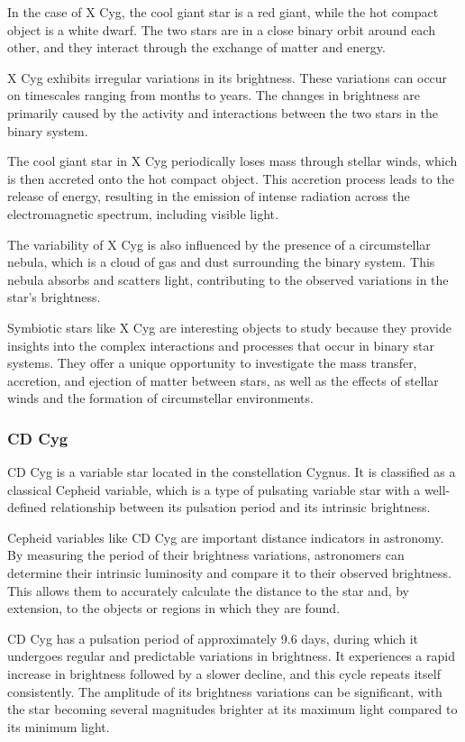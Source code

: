 In the case of X Cyg, the cool giant star is a red giant, while the hot compact object is a white dwarf. The two stars are in a close binary orbit around each other, and they interact through the exchange of matter and energy.

X Cyg exhibits irregular variations in its brightness. These variations can occur on timescales ranging from months to years. The changes in brightness are primarily caused by the activity and interactions between the two stars in the binary system.

The cool giant star in X Cyg periodically loses mass through stellar winds, which is then accreted onto the hot compact object. This accretion process leads to the release of energy, resulting in the emission of intense radiation across the electromagnetic spectrum, including visible light.

The variability of X Cyg is also influenced by the presence of a circumstellar nebula, which is a cloud of gas and dust surrounding the binary system. This nebula absorbs and scatters light, contributing to the observed variations in the star's brightness.

Symbiotic stars like X Cyg are interesting objects to study because they provide insights into the complex interactions and processes that occur in binary star systems. They offer a unique opportunity to investigate the mass transfer, accretion, and ejection of matter between stars, as well as the effects of stellar winds and the formation of circumstellar environments.


\subsubsection*{ CD Cyg }

CD Cyg is a variable star located in the constellation Cygnus. It is classified as a classical Cepheid variable, which is a type of pulsating variable star with a well-defined relationship between its pulsation period and its intrinsic brightness.

Cepheid variables like CD Cyg are important distance indicators in astronomy. By measuring the period of their brightness variations, astronomers can determine their intrinsic luminosity and compare it to their observed brightness. This allows them to accurately calculate the distance to the star and, by extension, to the objects or regions in which they are found.

CD Cyg has a pulsation period of approximately 9.6 days, during which it undergoes regular and predictable variations in brightness. It experiences a rapid increase in brightness followed by a slower decline, and this cycle repeats itself consistently. The amplitude of its brightness variations can be significant, with the star becoming several magnitudes brighter at its maximum light compared to its minimum light.

